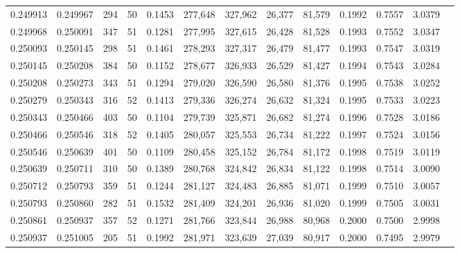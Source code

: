 \begin{tabular}{rrrrrrrrrrrrr}
0.249913 & 0.249967 &   294 &  50 &                                     0.1453 & 277,648 & 327,962 &  26,377 &  81,579 & 0.1992 & 0.7557 & 3.0379 \\
0.249968 & 0.250091 &   347 &  51 &                                     0.1281 & 277,995 & 327,615 &  26,428 &  81,528 & 0.1993 & 0.7552 & 3.0347 \\
0.250093 & 0.250145 &   298 &  51 &                                     0.1461 & 278,293 & 327,317 &  26,479 &  81,477 & 0.1993 & 0.7547 & 3.0319 \\
0.250145 & 0.250208 &   384 &  50 &                                     0.1152 & 278,677 & 326,933 &  26,529 &  81,427 & 0.1994 & 0.7543 & 3.0284 \\
0.250208 & 0.250273 &   343 &  51 &                                     0.1294 & 279,020 & 326,590 &  26,580 &  81,376 & 0.1995 & 0.7538 & 3.0252 \\
0.250279 & 0.250343 &   316 &  52 &                                     0.1413 & 279,336 & 326,274 &  26,632 &  81,324 & 0.1995 & 0.7533 & 3.0223 \\
0.250343 & 0.250466 &   403 &  50 &                                     0.1104 & 279,739 & 325,871 &  26,682 &  81,274 & 0.1996 & 0.7528 & 3.0186 \\
0.250466 & 0.250546 &   318 &  52 &                                     0.1405 & 280,057 & 325,553 &  26,734 &  81,222 & 0.1997 & 0.7524 & 3.0156 \\
0.250546 & 0.250639 &   401 &  50 &                                     0.1109 & 280,458 & 325,152 &  26,784 &  81,172 & 0.1998 & 0.7519 & 3.0119 \\
0.250639 & 0.250711 &   310 &  50 &                                     0.1389 & 280,768 & 324,842 &  26,834 &  81,122 & 0.1998 & 0.7514 & 3.0090 \\
0.250712 & 0.250793 &   359 &  51 &                                     0.1244 & 281,127 & 324,483 &  26,885 &  81,071 & 0.1999 & 0.7510 & 3.0057 \\
0.250793 & 0.250860 &   282 &  51 &                                     0.1532 & 281,409 & 324,201 &  26,936 &  81,020 & 0.1999 & 0.7505 & 3.0031 \\
0.250861 & 0.250937 &   357 &  52 &                                     0.1271 & 281,766 & 323,844 &  26,988 &  80,968 & 0.2000 & 0.7500 & 2.9998 \\
0.250937 & 0.251005 &   205 &  51 &                                     0.1992 & 281,971 & 323,639 &  27,039 &  80,917 & 0.2000 & 0.7495 & 2.9979 \\

\end{tabular}
